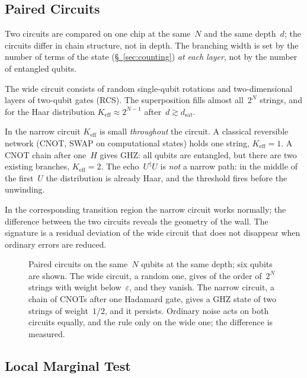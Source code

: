 \documentclass[11pt,a4paper]{article}
\newcommand{\Keff}{K_{\mathrm{eff}}}
\begin{document}
\subsection{Paired Circuits}
\label{sec:pair}

Two circuits are compared on one chip at the same~$N$ and the same depth~$d$; the circuits differ in chain structure, not in depth. The branching width is set by the number of terms of the state (\hyperref[sec:counting]{\S~\ref*{sec:counting}}) \emph{at each layer}, not by the number of entangled qubits.

The wide circuit consists of random single-qubit rotations and two-dimensional layers of two-qubit gates (RCS). The superposition fills almost all~$2^N$ strings, and for the Haar distribution $\Keff\approx2^{N-1}$ after~$d\gtrsim d_{\mathrm{sat}}$.

In the narrow circuit $\Keff$ is small \emph{throughout} the circuit. A classical reversible network (CNOT, SWAP on computational states) holds one string, $\Keff=1$. A CNOT chain after one~$H$ gives GHZ: all qubits are entangled, but there are two existing branches, $\Keff=2$. The echo~$U^\dagger U$ is \emph{not} a narrow path: in the middle of the first~$U$ the distribution is already Haar, and the threshold fires before the unwinding.

In the corresponding transition region the narrow circuit works normally; the difference between the two circuits reveals the geometry of the wall. The signature is a residual deviation of the wide circuit that does not disappear when ordinary errors are reduced.

\begin{figure}[ht]
\centering

\caption{Paired circuits on the same~$N$ qubits at the same depth; six qubits are shown. The wide circuit, a random one, gives of the order of~$2^N$ strings with weight below~$\varepsilon$, and they vanish. The narrow circuit, a chain of CNOTs after one Hadamard gate, gives a GHZ state of two strings of weight~$1/2$, and it persists. Ordinary noise acts on both circuits equally, and the rule only on the wide one; the difference is measured.}
\label{fig:pair}
\end{figure}

\subsection{Local Marginal Test}
\label{sec:marginal}
\end{document}
